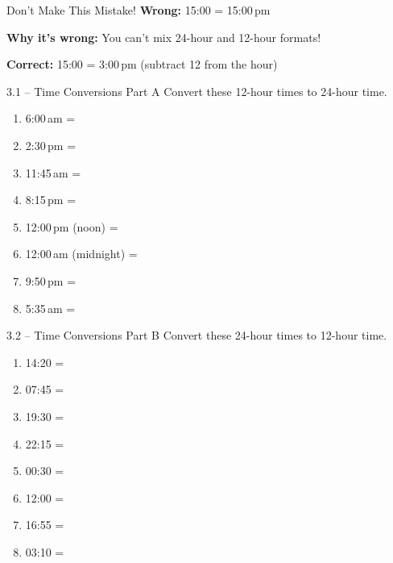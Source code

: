 \documentclass[12pt,a4paper]{article}
\begin{document}
\begin{warningbox}{Don't Make This Mistake!}
\textbf{Wrong:} 15:00 = 15:00\,pm

\textbf{Why it's wrong:} You can't mix 24-hour and 12-hour formats!

\textbf{Correct:} 15:00 = 3:00\,pm (subtract 12 from the hour)
\end{warningbox}

\begin{exercisebox}{3.1 -- Time Conversions Part A}
Convert these 12-hour times to 24-hour time.

\begin{enumerate}[leftmargin=*]
\item 6:00\,am = \underline{\hspace{3cm}}
\item 2:30\,pm = \underline{\hspace{3cm}}
\item 11:45\,am = \underline{\hspace{3cm}}
\item 8:15\,pm = \underline{\hspace{3cm}}
\item 12:00\,pm (noon) = \underline{\hspace{3cm}}
\item 12:00\,am (midnight) = \underline{\hspace{3cm}}
\item 9:50\,pm = \underline{\hspace{3cm}}
\item 5:35\,am = \underline{\hspace{3cm}}
\end{enumerate}
\end{exercisebox}

\begin{exercisebox}{3.2 -- Time Conversions Part B}
Convert these 24-hour times to 12-hour time.

\begin{enumerate}[leftmargin=*]
\item 14:20 = \underline{\hspace{3cm}}
\item 07:45 = \underline{\hspace{3cm}}
\item 19:30 = \underline{\hspace{3cm}}
\item 22:15 = \underline{\hspace{3cm}}
\item 00:30 = \underline{\hspace{3cm}}
\item 12:00 = \underline{\hspace{3cm}}
\item 16:55 = \underline{\hspace{3cm}}
\item 03:10 = \underline{\hspace{3cm}}
\end{enumerate}
\end{exercisebox}
\end{document}
